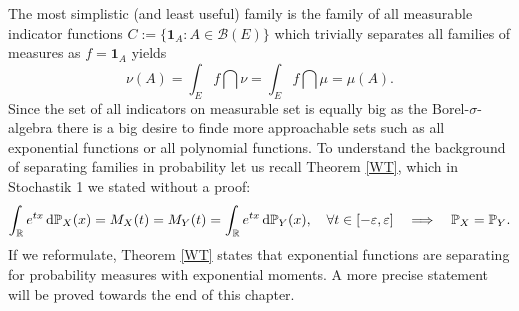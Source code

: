 The most simplistic (and least useful) family is the family of all measurable indicator functions $C:=\{\mathbf 1_A: A\in \mathcal B(E)\}$ which trivially separates all families of measures as $f=\mathbf 1_A$ yields
 $$\nu(A) = \int_E f\dint \nu = \int_E f \dint \mu = \mu (A).$$
Since the set of all indicators on measurable set is equally big as the Borel-$\sigma$-algebra there is a big desire to finde more approachable sets such as all exponential functions or all polynomial functions. To understand the background of separating families in probability let us recall Theorem \ref{WT}, which in Stochastik 1 we stated without a proof:
\begin{align*}
	\int_{\mathbb{R}} e^{t x} \, \mathrm{d} \mathbb P_X(x)=M_X(t)=M_Y(t)= \int_{\mathbb{R}} e^{t x} \, \mathrm{d} \mathbb P_Y(x),\quad \forall t\in [-\varepsilon,\varepsilon]\quad \Longrightarrow \quad \mathbb P_X=\mathbb P_Y.
\end{align*}
If we reformulate, Theorem \ref{WT} states that exponential functions are separating for probability measures with exponential moments. A more precise statement will be proved towards the end of this chapter.\smallskip

